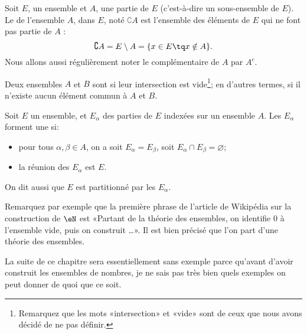 \begin{definition}		\label{DEFooJLBVooMyCQMO}
	Soit \( E\), un ensemble et \( A\), une partie de \( E\) (c'est-à-dire un sous-ensemble de \( E\)). Le  de l'ensemble \(A \), dans \( E\), noté \( \complement A\) est l'ensemble des éléments de \( E\) qui ne font pas partie de \( A\) :
	\begin{equation}
		\complement A=E\setminus A=\{ x\in E\tq x\notin A \}.
	\end{equation}
	Nous allons aussi régulièrement noter le complémentaire de \( A\) par \( A^c\).
\end{definition}

\begin{definition}\label{DefEnsemblesDisjoints}
	Deux ensembles \( A\) et \( B\) sont  si leur intersection est vide\footnote{Remarquez que les mots «intersection» et «vide» sont de ceux que nous avons décidé de ne pas définir.}; en d'autres termes, si il n'existe aucun élément commun à \( A\) et \( B\).
\end{definition}

\begin{definition}    \label{DefPartitionEnsembles}
	Soit \( E \) un ensemble, et \( E_\alpha \) des parties de \( E \) indexées sur un ensemble \( A \). Les \( E_\alpha \) forment une  si:
	\begin{itemize}
		\item pour tous \( \alpha, \beta \in A \), on a soit \( E_\alpha =  E_\beta \), soit \( E_\alpha \cap E_\beta = \varnothing \);
		\item la réunion des \( E_\alpha \) est \( E \).
	\end{itemize}
	On dit aussi que \( E \) est partitionné par les \(E_\alpha\).
\end{definition}

\begin{normaltext}\label{NorooDepartTheoEns}
	Remarquez par exemple que la première phrase de l'article de Wikipédia sur la construction de \( \eN\) est «Partant de la théorie des ensembles, on identifie 0 à l'ensemble vide, puis on construit \ldots». Il est bien précisé que l'on part d'une théorie des ensembles.

	La suite de ce chapitre sera essentiellement sans exemple parce qu'avant d'avoir construit les ensembles de nombres, je ne sais pas très bien quels exemples on peut donner de quoi que ce soit.
\end{normaltext}




